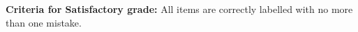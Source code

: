 \documentclass[10pt]{article}
\begin{document}
\vfill

\begin{small}
    \begin{framed}
        	\textbf{Criteria for Satisfactory grade:} All items are correctly labelled with no more than one mistake. 
    \end{framed}

\end{small}
\end{document}
